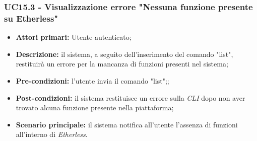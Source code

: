 \subsubsection{UC15.3 - Visualizzazione errore "Nessuna funzione presente su Etherless\glos"}
\begin{itemize}
	\item \textbf{Attori primari:} Utente autenticato;
	\item \textbf{Descrizione:} il sistema, a seguito dell'inserimento del comando "list", restituirà un errore per la mancanza di funzioni presenti nel sistema;
	\item \textbf{Pre-condizioni:} l'utente invia il comando "list";;
	\item \textbf{Post-condizioni:} il sistema restituisce un errore sulla \textit{CLI\glo} dopo non aver trovato alcuna funzione presente nella piattaforma;
	\item \textbf{Scenario principale:} il sistema notifica all'utente l'assenza di funzioni all'interno di \textit{Etherless\glos}.
\end{itemize}
